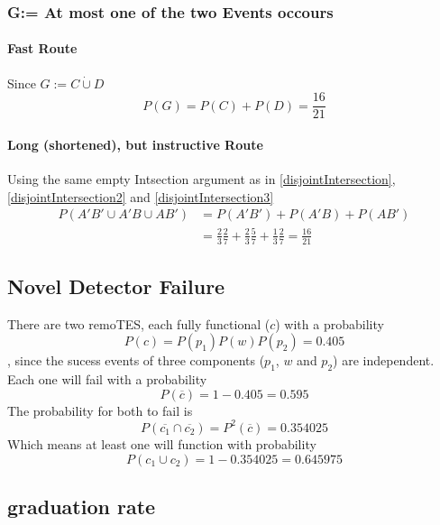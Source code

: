 \subsubsection{G:= At most one of the two Events occours}
\paragraph{Fast Route}
Since $G:=C\dot\cup D$
\begin{equation}
    P\left(G\right)=P\left(C\right)+P\left(D\right)=\frac{16}{21}
\end{equation}
\paragraph{Long (shortened), but instructive Route}
Using the same empty Intsection argument as in \ref{disjointIntersection}, \ref{disjointIntersection2} and \ref{disjointIntersection3}
\begin{align}
    P\left(A'B'\cup A'B\cup AB'\right)&=P\left(A'B'\right)+P\left(A'B\right)+P\left(AB'\right)
    \\&=\frac{2}{3}\frac{2}{7}+\frac{2}{3}\frac{5}{7}+\frac{1}{3}\frac{2}{7}=\frac{16}{21}
\end{align}
\subsection{Novel Detector Failure}
There are two remoTES, each fully functional ($c$) with a probability
\begin{equation}
    P\left(c\right) = P\left(p_1\right)P\left(w\right)P\left(p_2\right) = 0.405
\end{equation},
since the sucess events of three components ($p_1$, $w$ and $p_2$) are independent.
Each one will fail with a probability
\begin{equation}
    P\left(\overline{c}\right)=1-0.405=0.595
\end{equation}
The probability for both to fail is
\begin{equation}
    P\left(\overline{c_1}\cap \overline{c_2}\right) = P^2\left(\overline{c}\right)=0.354025
\end{equation}
Which means at least one will function with probability
\begin{equation}
    P\left(c_1\cup c_2\right) = 1-0.354025= 0.645975
\end{equation}
\subsection{graduation rate}
